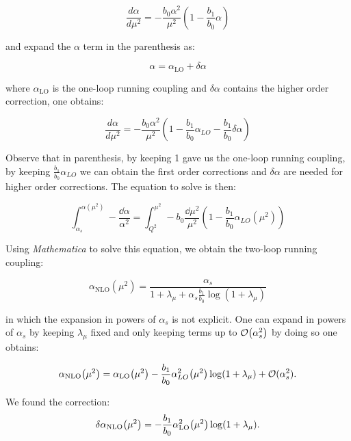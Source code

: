 \documentclass[../main.tex]{subfiles}
\begin{document}
\begin{equation}
    \frac{d\alpha}{d\mu^2} = - \frac{b_0 \alpha^2}{\mu^2} ( 1 - \frac{b_1}{b_0} \alpha )
\end{equation}

and expand the $\alpha$ term in the parenthesis as:

\begin{equation}
    \alpha = \alpha_{\text{LO}} + \delta \alpha
\end{equation}

where $\alpha_{\text{LO}}$ is the one-loop running coupling and $\delta\alpha$ contains the higher order correction, one obtains:

\begin{equation}
    \frac{d\alpha}{d\mu^2} = - \frac{b_0 \alpha^2}{\mu^2} ( 1 - \frac{b_1}{b_0} \alpha_{LO} - \frac{b_1}{b_0} \delta\alpha)
\end{equation}

Observe that in parenthesis, by keeping 1 gave us the one-loop running coupling, by keeping $\frac{b_1}{b_0} \alpha_{LO}$ we can obtain the first order corrections
and $\delta\alpha$ are needed for higher order corrections. The equation to solve is then:

\begin{equation}
    \int_{\alpha_s}^{\alpha(\mu^2)} -\frac{\dd\alpha}{\alpha^2} = 
    \int _{Q^2}^{\mu^2} - b_0 \frac{ \dd\mu^2}{\mu^2} ( 1 - \frac{b_1}{b_0} \alpha_{LO}(\mu^2) )
\end{equation}

Using \emph{Mathematica} \cite{Mathematica} to solve this equation, we obtain the two-loop running coupling:

\begin{equation}
    \alpha_{\text{NLO}}(\mu^2) = \frac{\alpha_s}{1+\lambda_\mu + \alpha_s \frac{b_1}{b_0} \log(1+\lambda_\mu)}
\end{equation}

in which the expansion in powers of $\alpha_s$ is not explicit. One can expand 
in powers of $\alpha_s$ by keeping $\lambda_\mu$ fixed and only keeping terms up to 
$\order{\alpha_s^2}$ by doing so one obtains:

\begin{equation}\label{eq:NLO}
    \alpha_{\text{NLO}}\qty(\mu^2) = \alpha_{\text{LO}}\qty(\mu^2) -\frac{b_1}{b_0} \alpha_{LO}^2\qty(\mu^2) \log(1+\lambda_\mu) + \mathcal{O}(\alpha_s^2) .
\end{equation}

We found the correction: 
\begin{equation}\label{eq:DNLO}
\delta\alpha_{\text{NLO}}\qty(\mu^2) = -\frac{b_1}{b_0} \alpha_{\text{LO}}^2\qty(\mu^2) \log(1+\lambda_\mu) .
\end{equation}
\end{document}
